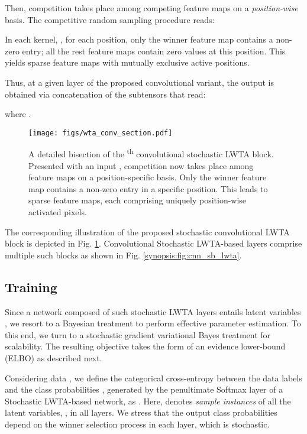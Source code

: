\documentclass{article}
\begin{document}
Then, competition takes place among competing feature maps on a \textit{position-wise} basis. The competitive random sampling procedure reads:

In each kernel, , for each position, only the winner feature map contains a non-zero entry; all the rest feature maps contain zero values at this position. This yields sparse feature maps with mutually exclusive active positions. 
	
	Thus, at a given layer of the proposed convolutional variant, the output  is obtained via concatenation of the subtensors  that read:
	
	where .
\begin{figure}
		\centering
		\texttt{[image: figs/wta\_conv\_section.pdf]}
		\caption{A detailed bisection of the \textsuperscript{th} convolutional stochastic LWTA block. Presented with an input , competition now takes place among feature maps on a position-specific basis. Only the winner feature map contains a non-zero entry in a specific position. This leads to sparse feature maps, each comprising uniquely position-wise activated pixels.
		}
		\label{fig:block_conv}
	\end{figure}
The corresponding illustration of the proposed stochastic convolutional LWTA block is depicted in Fig. \ref{fig:block_conv}. Convolutional Stochastic LWTA-based layers comprise multiple such blocks as shown in Fig. \ref{synopsis:fig:cnn_sb_lwta}.
	
	\subsection{Training}
	
	Since a network composed of such stochastic LWTA layers entails latent variables , we resort to a Bayesian treatment to perform effective parameter estimation. To this end, we turn to a stochastic gradient variational Bayes treatment \citep{kingma2014autoencoding} for scalability. The resulting objective takes the form of an evidence lower-bound (ELBO) as described next. 
	
	
	Considering data , we define the categorical cross-entropy between the data labels  and the class probabilities , generated by the penultimate Softmax layer of a Stochastic LWTA-based network, as . Here,  denotes \textit{sample instances} of all the latent variables, , in all layers. We stress that the output class probabilities depend on the winner selection process in each layer, which is stochastic. 
	
\end{document}
